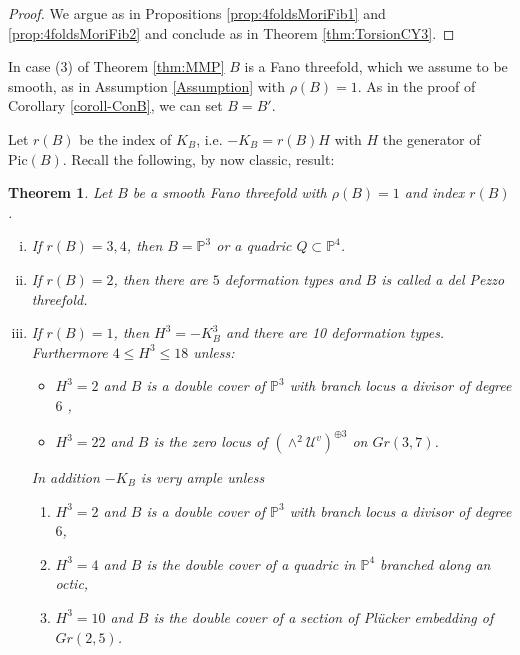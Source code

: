 \documentclass[11pt]{amsart}
\newtheorem{theorem}{Theorem}[section]
\theoremstyle{definition}
\theoremstyle{definition}
\theoremstyle{remark}
\theoremstyle{remark}
\theoremstyle{definition}
\theoremstyle{conjecture}
\newcommand{\Pic}{\mathrm{Pic}}
\begin{document}
\begin{proof}  We argue as in Propositions \ref{prop:4foldsMoriFib1} and \ref{prop:4foldsMoriFib2} and conclude as in Theorem \ref{thm:TorsionCY3}. \end{proof}

\vskip 0.2in

In case (3) of  Theorem \ref{thm:MMP} $B$ is a Fano threefold, which we assume to be smooth, as in Assumption \ref{Assumption}  with $\rho(B)%
=1$.
 As in the proof of Corollary \ref{coroll-ConB}, we can set $B = B'$.


Let $r(B)$ be  the index of $K_B$, i.e. $-K_B = r(B) H$ with $H$ the generator of $\Pic(B)$.
Recall the following, by now classic, result:

\begin{theorem}\cite[Table 6.5]{Iskovskih1978FanoII} Let $B$ be a smooth Fano threefold  with  $\rho  (B)=1$ and index $r(B)$. 
\begin{enumerate}[(i)]
    \item  If $r(B)=3,4$, then $B= \mathbb{P}^3$ or  a quadric $Q \subset \mathbb{P}^4$.
    \item  If  $r(B)=2$, then  there are $5$ deformation types and $B$ is called a del Pezzo threefold.
    \item  If $r(B)=1$, then $H^3=-K_B^3 $ and there are 10 deformation types.\\ Furthermore $4 \leq H^3 \leq 18$ unless:
    \begin{itemize}
    \item  $H^3 =2$ and $B$ is a double cover of $\mathbb{P}^3$ with branch locus a divisor of degree $6$%
    ,
    \item  $H^3 = 22$ and $B$ is the zero locus of $(\wedge^2\mathcal{U}^{v})^{\oplus 3}$ on $Gr(3,7)$.
    \end{itemize}
    
    In addition $-K_B$ is very ample unless
    \begin{enumerate}
  \item $H^3 =2$ and $B$ is a double cover of $\mathbb{P}^3$ with branch locus a divisor of degree $6$,
\item $H^3=4$ and $B$ is the double cover of a quadric in $\mathbb{P}^4$ branched along an octic,
\item $H^3=10$ and $B$ is the double cover of a section of Plücker embedding of $Gr(2,5)$.
    \end{enumerate}
        
\end{enumerate}
    
\end{theorem}
\end{document}
